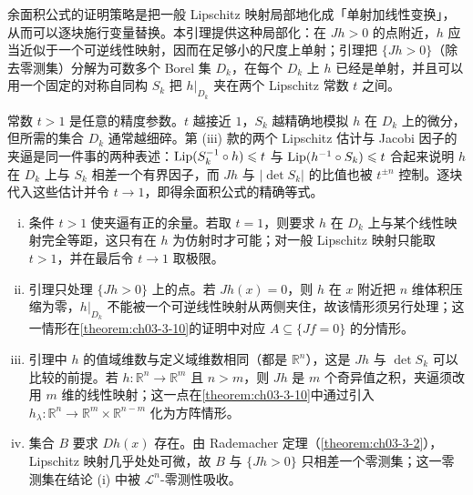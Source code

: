 \documentclass[../../main.tex]{subfiles}%
\begin{document}
\begin{remark}\label{remark:ch03-lem-3-6-动机}
余面积公式的证明策略是把一般 Lipschitz 映射局部地化成「单射加线性变换」，从而可以逐块施行变量替换。本引理提供这种局部化：在 $Jh>0$ 的点附近，$h$ 应当近似于一个可逆线性映射，因而在足够小的尺度上单射；引理把 $\{Jh>0\}$（除去零测集）分解为可数多个 Borel 集 $D_k$，在每个 $D_k$ 上 $h$ 已经是单射，并且可以用一个固定的对称自同构 $S_k$ 把 $h|_{D_k}$ 夹在两个 Lipschitz 常数 $t$ 之间。

常数 $t>1$ 是任意的精度参数。$t$ 越接近 $1$，$S_k$ 越精确地模拟 $h$ 在 $D_k$ 上的微分，但所需的集合 $D_k$ 通常越细碎。第 (iii) 款的两个 Lipschitz 估计与 Jacobi 因子的夹逼是同一件事的两种表述：$\operatorname{Lip}(S_k^{-1}\circ h)\leqslant t$ 与 $\operatorname{Lip}(h^{-1}\circ S_k)\leqslant t$ 合起来说明 $h$ 在 $D_k$ 上与 $S_k$ 相差一个有界因子，而 $Jh$ 与 $\lvert\det S_k\rvert$ 的比值也被 $t^{\pm n}$ 控制。逐块代入这些估计并令 $t\to1$，即得余面积公式的精确等式。
\end{remark}

\begin{remark}\label{remark:ch03-lem-3-6-条件}
\begin{enumerate}[(i)]
\item 条件 $t>1$ 使夹逼有正的余量。若取 $t=1$，则要求 $h$ 在 $D_k$ 上与某个线性映射完全等距，这只有在 $h$ 为仿射时才可能；对一般 Lipschitz 映射只能取 $t>1$，并在最后令 $t\to1$ 取极限。
\item 引理只处理 $\{Jh>0\}$ 上的点。若 $Jh(x)=0$，则 $h$ 在 $x$ 附近把 $n$ 维体积压缩为零，$h|_{D_k}$ 不能被一个可逆线性映射从两侧夹住，故该情形须另行处理；这一情形在\cref{theorem:ch03-3-10}的证明中对应 $A\subseteq\{Jf=0\}$ 的分情形。%
\item 引理中 $h$ 的值域维数与定义域维数相同（都是 $\mathbb{R}^n$），这是 $Jh$ 与 $\det S_k$ 可以比较的前提。若 $h:\mathbb{R}^n\to\mathbb{R}^m$ 且 $n>m$，则 $Jh$ 是 $m$ 个奇异值之积，夹逼须改用 $m$ 维的线性映射；这一点在\cref{theorem:ch03-3-10}中通过引入 $h_\lambda:\mathbb{R}^n\to\mathbb{R}^m\times\mathbb{R}^{n-m}$ 化为方阵情形。%
\item 集合 $B$ 要求 $Dh(x)$ 存在。由 Rademacher 定理（\cref{theorem:ch03-3-2}），Lipschitz 映射几乎处处可微，故 $B$ 与 $\{Jh>0\}$ 只相差一个零测集；这一零测集在结论 (i) 中被 $\mathcal{L}^n$-零测性吸收。%
\end{enumerate}
\end{remark}
\end{document}
